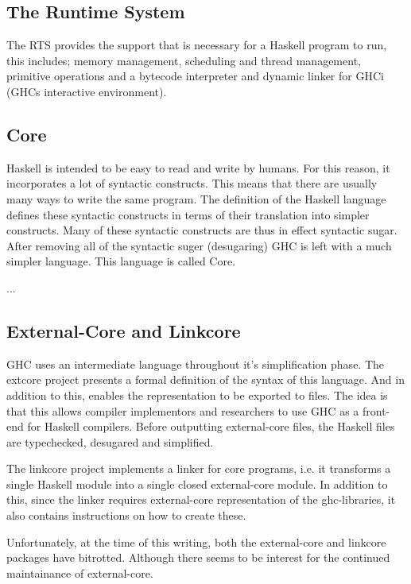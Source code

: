 \subsection{The Runtime System}

The RTS provides the support that is necessary for a Haskell program to run, this
includes; memory management, scheduling and thread management, primitive operations
and a bytecode interpreter and dynamic linker for GHCi (GHCs interactive environment).
\cite{marlow2012glasgow} 

\subsection{Core}

Haskell is intended to be easy to read and write by humans. For this reason, it
incorporates a lot of syntactic constructs. This means that there are
usually many ways to write the same program. The definition of the Haskell language
defines these syntactic constructs in terms of their translation into simpler
constructs. Many of these syntactic constructs are thus in effect syntactic sugar.
After removing all of the syntactic suger (desugaring) GHC is left with a much 
simpler language. This language is called Core.

...
\cite{marlow2012glasgow}

\subsection{External-Core and Linkcore}

GHC uses an intermediate language throughout it's 
simplification phase. The extcore project presents a formal definition of the syntax 
of this language. And in addition to this, enables the representation to be exported 
to files. The idea is that this allows compiler implementors and researchers to use GHC
as a front-end for Haskell compilers. Before outputting external-core files,
the Haskell files are typechecked, desugared and simplified. \cite{tolmach2010ghc}

The linkcore project implements a linker for core programs, i.e. it transforms
a single Haskell module into a single closed external-core module. In addition to
this, since the linker requires external-core representation of the ghc-libraries,
it also contains instructions on how to create these. 

Unfortunately, at the time of this writing, both the external-core and linkcore 
packages have bitrotted. Although there seems to be interest for the continued 
maintainance of external-core.


